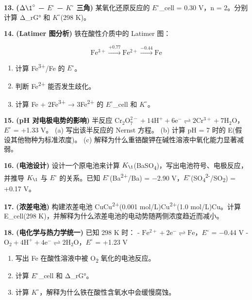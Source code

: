 \textbf{13.} \textbf{(\(\Delta \1^{\circ}\) − \(E^{\circ}\) − \(K^{\circ}\) 三角)} 某氧化还原反应的 \(E^{\circ}\)\_cell = 0.30 V，n = 2。分别计算 Δ\_rG° 和 \(K^{\circ}\)(298 K)。

\textbf{14.} \textbf{(Latimer 图分析)} 铁在酸性介质中的 Latimer 图：

\[\mathrm{Fe^{3+}} \xrightarrow{+0.77} \mathrm{Fe^{2+}} \xrightarrow{-0.44} \mathrm{Fe}\]

\begin{enumerate}
\def\labelenumi{(\alph{enumi})}
\tightlist
\item
  计算 Fe\textsuperscript{3+}/Fe 的 \(E^{\circ}\)。
\item
  判断 Fe\textsuperscript{2+} 能否发生歧化。
\item
  计算 Fe + 2Fe\textsuperscript{3+} → 3Fe\textsuperscript{2+} 的 \(E^{\circ}\)\_cell 和 \(K^{\circ}\)。
\end{enumerate}

\textbf{15.} \textbf{(pH 对电极电势的影响)} 半反应 \(\mathrm{Cr_2O_7^{2-} + 14H^+ + 6e^- \rightleftharpoons 2Cr^{3+} + 7H_2O}\)，\(E^{\circ}\) = +1.33 V。
(a) 写出该半反应的 Nernst 方程。
(b) 计算 pH = 7 时的 E(假设其他物种为标准浓度)。
(c) 解释为什么重铬酸钾在碱性溶液中氧化能力显著减弱。

\textbf{16.} \textbf{(电池设计)} 设计一个原电池来计算 \(K_{\1}\)(BaSO\textsubscript{4})，写出电池符号、电极反应，并推导 \(K_{\1}\) 与 \(E^{\circ}\) 的关系。已知 \(E^{\circ}\)(Ba\textsuperscript{2+}/Ba) = −2.90 V，\(E^{\circ}\)(SO\textsubscript{4}\textsuperscript{2-}/SO\textsubscript{2}) = +0.17 V。

\textbf{17.} \textbf{(浓差电池)} 构建浓差电池 Cu\textbar Cu\textsuperscript{2+}(0.001 mol/L)\textbar\textbar Cu\textsuperscript{2+}(1.0 mol/L)\textbar Cu。计算 E\_cell(298 K)，并解释为什么浓差电池的电动势随两侧浓度趋近而减小。

\textbf{18.} \textbf{(电化学与热力学统一)} 已知 298 K 时：
- \(\mathrm{Fe^{2+} + 2e^- \rightleftharpoons Fe}\)，\(E^{\circ}\) = −0.44 V
- \(\mathrm{O_2 + 4H^+ + 4e^- \rightleftharpoons 2H_2O}\)，\(E^{\circ}\) = +1.23 V

\begin{enumerate}
\def\labelenumi{(\alph{enumi})}
\tightlist
\item
  写出 Fe 在酸性溶液中被 O\textsubscript{2} 氧化的电池反应。
\item
  计算 \(E^{\circ}\)\_cell 和 Δ\_rG°。
\item
  计算 \(K^{\circ}\)，解释为什么铁在酸性含氧水中会缓慢腐蚀。
\end{enumerate}

